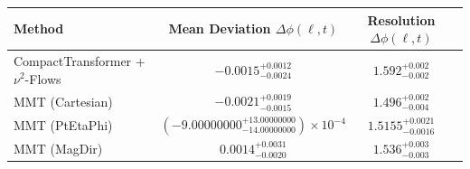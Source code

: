     \begin{tabular}{lccc}
        \toprule
        Method & Mean Deviation $\Delta\phi(\ell, t)$ & Resolution $\Delta\phi(\ell, t)$ \\
        \midrule
        CompactTransformer + $\nu^2$-Flows & $-0.0015^{+0.0012}_{-0.0024}$ & $1.592^{+0.002}_{-0.002}$ \\
        MMT (Cartesian) & $-0.0021^{+0.0019}_{-0.0015}$ & $1.496^{+0.002}_{-0.004}$ \\
        MMT (PtEtaPhi) & $(-9.00000000^{+13.00000000}_{-14.00000000})\times 10^{-4}$ & $1.5155^{+0.0021}_{-0.0016}$ \\
        MMT (MagDir) & $0.0014^{+0.0031}_{-0.0020}$ & $1.536^{+0.003}_{-0.003}$ \\
        \bottomrule
    \end{tabular}
